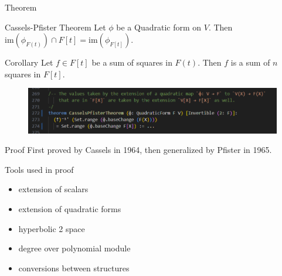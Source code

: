 \documentclass[svgnames]{beamer}
\begin{document}
\begin{frame}{Theorem}
\begin{block}{Cassels-Pfister Theorem}
Let $\phi$ be a Quadratic form on $V$. Then $\text{im}(\phi_{F(t)}) \cap F[t]= \text{im}(\phi_{F[t]})$. 
\end{block}
\pause \begin{block}{Corollary}
Let $f \in F[t]$ be a sum of squares in $F(t)$. Then $f$ is a sum of $n$ squares in $F[t]$. 
\end{block}

\pause \begin{figure}
    \centering
    \includegraphics[width=1\linewidth]{image.png}
\end{figure}

\end{frame}

\begin{frame}{Proof}
First proved by Cassels in 1964, then generalized by Pfister in 1965. 

Tools used in proof
\begin{itemize}
    \item extension of scalars
    \item extension of quadratic forms 
    \item hyperbolic 2 space
    \item degree over polynomial module
    \item conversions between structures
\end{itemize}
\end{frame}
\end{document}
